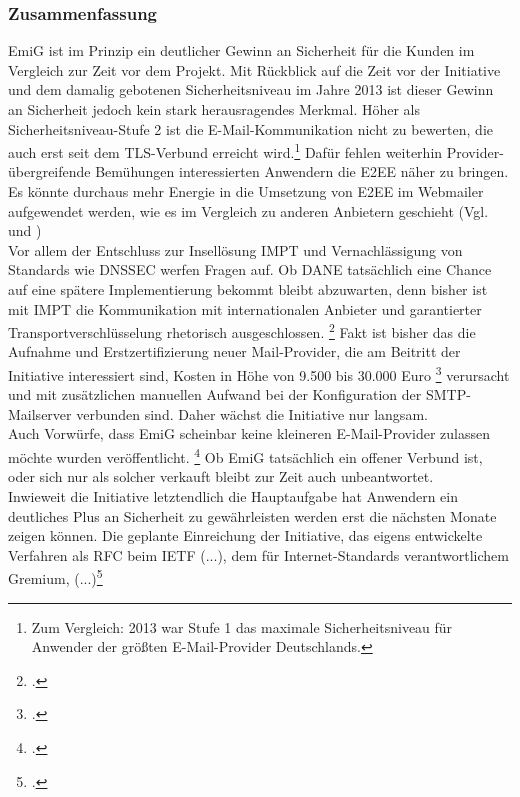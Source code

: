 \documentclass  [paper=a4,
				fontsize=12pt,
				listof=totoc,
				bibliography=totoc
				]{scrreprt}
\begin{document}
		\subsubsection{Zusammenfassung}
			EmiG ist im Prinzip ein deutlicher Gewinn an Sicherheit für die Kunden im Vergleich zur Zeit vor dem Projekt. 
			Mit Rückblick auf die Zeit vor der Initiative und dem damalig gebotenen Sicherheitsniveau im Jahre 2013 ist dieser Gewinn an Sicherheit jedoch kein stark herausragendes Merkmal.
			Höher als Sicherheitsniveau-Stufe 2 ist die E-Mail-Kommunikation nicht zu bewerten, die auch erst seit dem TLS-Verbund erreicht wird.\footnote{Zum Vergleich: 2013 war Stufe 1 das maximale Sicherheitsniveau für Anwender der größten E-Mail-Provider Deutschlands.}
			Dafür fehlen weiterhin Provider-übergreifende Bemühungen interessierten Anwendern die E2EE näher zu bringen.
			Es könnte durchaus mehr Energie in die Umsetzung von E2EE im Webmailer aufgewendet werden, wie es im Vergleich zu anderen Anbietern geschieht (Vgl.  und ) \medskip\\
			Vor allem der Entschluss zur Insellösung \ac{IMPT} und Vernachlässigung von Standards wie DNSSEC werfen Fragen auf. 
			Ob DANE tatsächlich eine Chance auf eine spätere Implementierung bekommt bleibt abzuwarten, denn bisher ist mit \ac{IMPT} die Kommunikation mit internationalen Anbieter und garantierter Transportverschlüsselung rhetorisch ausgeschlossen.
			\footcite[Vgl.][]{Zivadino14-1}
			Fakt ist bisher das die Aufnahme und Erstzertifizierung neuer Mail-Provider, die am Beitritt der Initiative interessiert sind, Kosten in Höhe von 9.500 bis 30.000 Euro
			\footcite[Vgl.][]{Zivadino14-3} 
			verursacht und mit zusätzlichen manuellen Aufwand bei der Konfiguration der SMTP-Mailserver verbunden sind.
			Daher wächst die Initiative nur langsam.\\
			Auch Vorwürfe, dass EmiG scheinbar keine kleineren E-Mail-Provider zulassen möchte wurden veröffentlicht.
			\footcite[Vgl.][]{Zivadino14-4}
			Ob EmiG tatsächlich ein offener Verbund ist, oder sich nur als solcher verkauft bleibt zur Zeit auch unbeantwortet. \medskip\\
			Inwieweit die Initiative letztendlich die Hauptaufgabe hat Anwendern ein deutliches Plus an Sicherheit zu gewährleisten werden erst die nächsten Monate zeigen können.
			Die geplante Einreichung der Initiative, das eigens entwickelte Verfahren als RFC beim IETF \glqq (...), dem für Internet-Standards verantwortlichem Gremium, (...)\grqq\footcite{Zivadino14-2}
\end{document}
